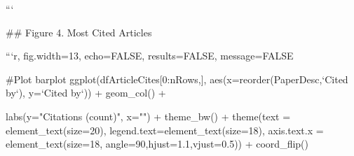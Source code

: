``` 

## Figure 4. Most Cited Articles

```{r, fig.width=13, echo=FALSE, results=FALSE, message=FALSE}

#Plot barplot 
ggplot(dfArticleCites[0:nRows,], aes(x=reorder(PaperDesc,`Cited by`), y=`Cited by`)) +
  geom_col() +
  
  labs(y="Citations (count)", x="") +
  theme_bw() +
  theme(text = element_text(size=20), legend.text=element_text(size=18),
        axis.text.x = element_text(size=18, angle=90,hjust=1.1,vjust=0.5)) +
  coord_flip()
